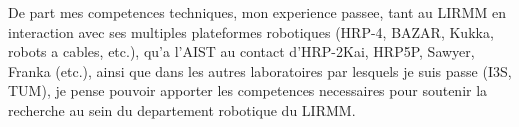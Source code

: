 \documentclass[11pt, a4paper]{awesome-cv}
\begin{document}
\begin{cvletter}
  De part mes competences techniques, mon experience passee, tant au LIRMM en interaction avec ses multiples plateformes robotiques (HRP-4, BAZAR, Kukka, robots a cables, etc.), qu'a l'AIST au contact d'HRP-2Kai, HRP5P, Sawyer, Franka (etc.), ainsi que dans les autres laboratoires par lesquels je suis passe (I3S, TUM), je pense pouvoir apporter les competences necessaires pour soutenir la recherche au sein du departement robotique du LIRMM. 

\end{cvletter}


\makeletterclosing
\end{document}
